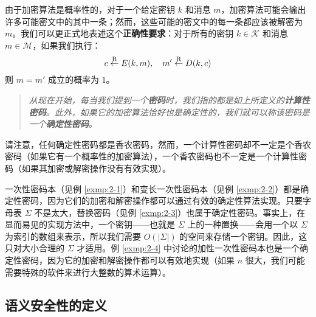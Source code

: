 由于加密算法是概率性的，对于一个给定密钥 $k$ 和消息 $m$，加密算法可能会输出许多可能密文中的其中一条；然而，这些可能的密文中的每一条都应该被解密为 $m$。我们可以更正式地表述这个\textbf{正确性要求}：对于所有的密钥 $k\in\mathcal{K}$ 和消息 $m\in\mathcal{M}$，如果我们执行：
\[
c\overset{\rm R}\leftarrow E(k,m),
\quad
m'\overset{\rm R}\leftarrow D(k,c)
\]
则 $m=m'$ 成立的概率为 $1$。

\begin{quote}
\begin{tcolorbox}[colframe=black,colback=white,boxrule=0.6pt,arc=0pt]
\emph{从现在开始，每当我们提到一个\textbf{密码}时，我们指的都是如上所定义的\textbf{计算性密码}。此外，如果它的加密算法恰好也是确定性的，我们就可以称该密码是一个\textbf{确定性密码}。}
\end{tcolorbox}
\end{quote}

请注意，任何确定性密码都是香农密码，然而，一个计算性密码却不一定是个香农密码（如果它有一个概率性的加密算法），一个香农密码也不一定是一个计算性密码（如果其加密或解密操作没有有效实现）。

\begin{example}
一次性密码本（见例 \ref{exmp:2-1}）和变长一次性密码本（见例 \ref{exmp:2-2}）都是确定性密码，因为它们的加密和解密操作都可以通过有效的确定性算法实现。只要字母表 $\Sigma$ 不是太大，替换密码（见例 \ref{exmp:2-3}）也属于确定性密码。事实上，在显而易见的实现方法中，一个密钥——也就是 $\Sigma$ 上的一种置换——会用一个以 $\Sigma$ 为索引的数组来表示，所以我们需要 $O(|\Sigma|)$ 的空间来存储一个密钥。因此，这只对大小合理的 $\Sigma$ 才适用。例 \ref{exmp:2-4} 中讨论的加性一次性密码本也是一个确定性密码，因为它的加密和解密操作都可以有效地实现（如果 $n$ 很大，我们可能需要特殊的软件来进行大整数的算术运算）。
\end{example}

\subsection{语义安全性的定义}

